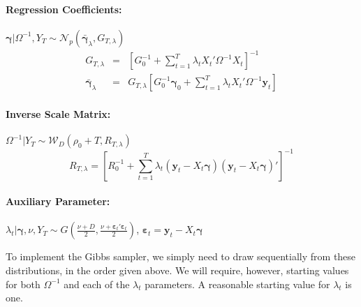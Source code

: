 \paragraph{Regression Coefficients:} 
$\boldsymbol{\gamma}|\Omega^{-1},Y_T \sim \mathcal{N}_p\left( \bar{\boldsymbol{\gamma}}_{\lambda},G_{T,\lambda} \right)$
\begin{eqnarray*}
	G_{T,\lambda} &=& \left[ G_0^{-1} + \sum_{t=1}^T \lambda_t X_t' \Omega^{-1} X_t \right]^{-1}\\
	\bar{\boldsymbol{\gamma}}_{\lambda} &=& G_{T,\lambda} \left[ G_0^{-1}\boldsymbol{\gamma}_0 + \sum_{t=1}^{T}\lambda_t X_t'\Omega^{-1}\mathbf{y}_t \right]
\end{eqnarray*}
\paragraph{Inverse Scale Matrix:}
$\Omega^{-1}|Y_T \sim \mathcal{W}_D\left(\rho_0 + T, R_{T,\lambda}\right)$
\begin{equation*}
R_{T,\lambda} = \left[ R_0^{-1} + \sum_{t=1}^{T} \lambda_t\left( \mathbf{y}_t - X_t \boldsymbol{\gamma} \right)\left( \mathbf{y}_t - X_t \boldsymbol{\gamma} \right)' \right]^{-1}
\end{equation*}

\paragraph{Auxiliary Parameter:} $\lambda_t|\boldsymbol{\gamma}, \nu, Y_T \sim G\left(\displaystyle \frac{\nu + D}{2}, \frac{\nu + \boldsymbol{\varepsilon}_t' \boldsymbol{\varepsilon}_t}{2} \right)$, $\boldsymbol{\varepsilon}_t = \mathbf{y}_t - X_t \boldsymbol{\gamma}$

To implement the Gibbs sampler, we simply need to draw sequentially from these distributions, in the order given above. 
We will require, however, starting values for both $\Omega^{-1}$ and each of the $\lambda_t$ parameters. 
A reasonable starting value for $\lambda_t$ is one.

